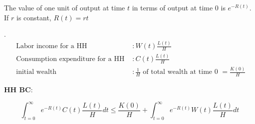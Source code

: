 \documentclass[12pt]{article}
\begin{document}
The value of one unit of output at time $ t $ in terms of output at time 0 is
$ e^{ - R(t)} $. If $ r $ is constant, $ R(t) = r t $


 $  $.
\begin{align*}
\text{ Labor income for a HH }&:W(t)\frac{L(t)}{H}\\
\text{ Consumption expenditure for a HH }&: C(t)\frac{L(t)}{H}\\
\text{ initial wealth }&: \frac{1}{H} \text{ of total wealth at time 0 }
= \frac{K(0)}{H}
\end{align*}



{\textbf {HH BC}}:

\begin{equation*}
\int_{t = 0}^{\infty } e^{ - R(t)}C(t)\frac{L(t)}{H}d t \le 
\frac{K(0)}{H} + \int_{t = 0}^{\infty } e^{ - R(t)} W(t)\frac{L(t)}{H} d t
\end{equation*}
\end{document}
